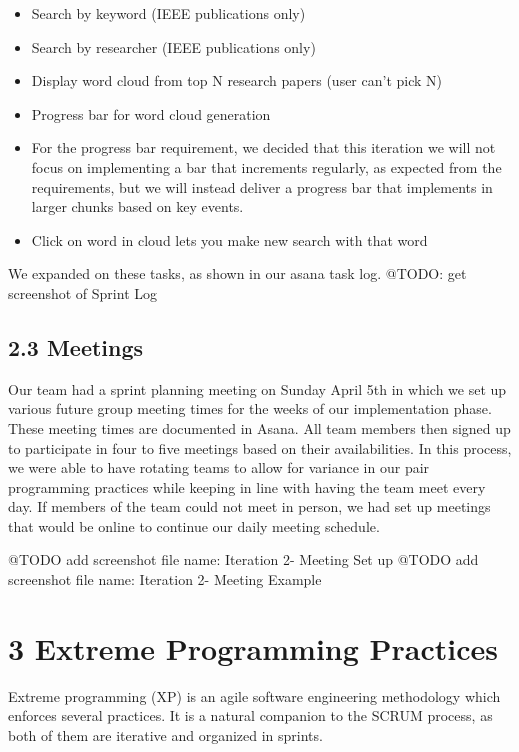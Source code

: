 \documentclass[]{article}
\begin{document}
\begin{itemize}
  \begin{itemize}
  \itemsep1pt\parskip0pt
  \item
    Search by keyword (IEEE publications only)
  \item
    Search by researcher (IEEE publications only)
  \item
    Display word cloud from top N research papers (user can't pick N)
  \item
    Progress bar for word cloud generation
  \item
    For the progress bar requirement, we decided that this iteration we
    will not focus on implementing a bar that increments regularly, as
    expected from the requirements, but we will instead deliver a
    progress bar that implements in larger chunks based on key events.
  \item
    Click on word in cloud lets you make new search with that word
  \end{itemize}
\end{itemize}

We expanded on these tasks, as shown in our asana task log. @TODO: get
screenshot of Sprint Log

\subsection{2.3 Meetings}\label{meetings}

Our team had a sprint planning meeting on Sunday April 5th in which we
set up various future group meeting times for the weeks of our
implementation phase. These meeting times are documented in Asana. All
team members then signed up to participate in four to five meetings
based on their availabilities. In this process, we were able to have
rotating teams to allow for variance in our pair programming practices
while keeping in line with having the team meet every day. If members of
the team could not meet in person, we had set up meetings that would be
online to continue our daily meeting schedule.

@TODO add screenshot file name: Iteration 2- Meeting Set up @TODO add
screenshot file name: Iteration 2- Meeting Example

\section{3 Extreme Programming
Practices}\label{extreme-programming-practices}

Extreme programming (XP) is an agile software engineering methodology
which enforces several practices. It is a natural companion to the SCRUM
process, as both of them are iterative and organized in sprints.
\end{document}
